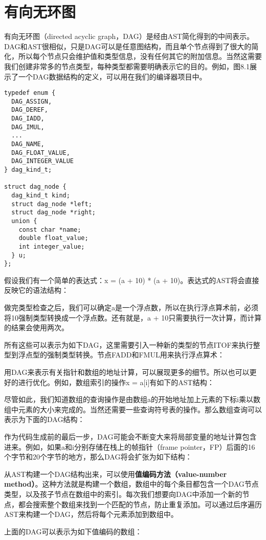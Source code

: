 \documentclass[cn,11pt,chinese]{elegantbook}
\begin{document}
\section{有向无环图}

有向无环图（directed acyclic graph，DAG）是经由AST简化得到的中间表示。DAG和AST很相似，只是DAG可以是任意图结构，而且单个节点得到了很大的简化，所以每个节点只会维护值和类型信息，没有任何其它的附加信息。当然这需要我们创建非常多的节点类型，每种类型都需要明确表示它的目的。例如，图8.1展示了一个DAG数据结构的定义，可以用在我们的编译器项目中。

\begin{verbatim}
typedef enum {
  DAG_ASSIGN,
  DAG_DEREF,
  DAG_IADD,
  DAG_IMUL,
  ...
  DAG_NAME,
  DAG_FLOAT_VALUE,
  DAG_INTEGER_VALUE
} dag_kind_t;

struct dag_node {
  dag_kind_t kind;
  struct dag_node *left;
  struct dag_node *right;
  union {
    const char *name;
    double float_value;
    int integer_value;
  } u;
};
\end{verbatim}

假设我们有一个简单的表达式：x = (a + 10) * (a + 10)。表达式的AST将会直接反映它的语法结构：

做完类型检查之后，我们可以确定a是一个浮点数，所以在执行浮点算术前，必须将10强制类型转换成一个浮点数。还有就是，a + 10只需要执行一次计算，而计算的结果会使用两次。

所有这些可以表示为如下DAG，这里需要引入一种新的类型的节点ITOF来执行整型到浮点型的强制类型转换。节点FADD和FMUL用来执行浮点算术：

用DAG来表示有关指针和数组的地址计算，可以展现更多的细节。所以也可以更好的进行优化。例如，数组索引的操作x = a[i]有如下的AST结构：

尽管如此，我们知道数组的查询操作是由数组a的开始地址加上元素的下标i乘以数组中元素的大小来完成的。当然还需要一些查询符号表的操作。那么数组查询可以表示为下面的DAG结构：

作为代码生成前的最后一步，DAG可能会不断变大来将局部变量的地址计算包含进来。例如，如果a和i分别存储在栈上的帧指针（frame pointer，FP）后面的16个字节和20个字节的地方，那么DAG将会扩张为如下结构：

从AST构建一个DAG结构出来，可以使用\textbf{值编码方法（value-number method）}。这种方法就是构建一个数组，数组中的每个条目都包含一个DAG节点类型，以及孩子节点在数组中的索引。每次我们想要向DAG中添加一个新的节点，都会搜索整个数组来找到一个匹配的节点，防止重复添加。可以通过后序遍历AST来构建一个DAG，然后将每个元素添加到数组中。

上面的DAG可以表示为如下值编码的数组：
\end{document}
